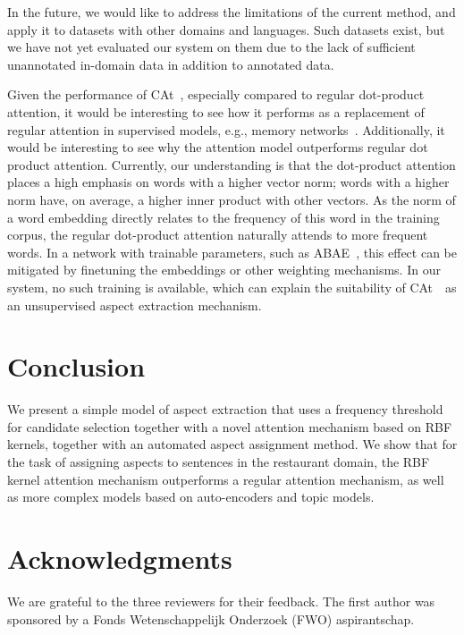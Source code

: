 \documentclass[11pt,a4paper]{article}
\newlength{\catheight}
\newcommand{\ourmodel}{CAt~\raisebox{-0.1ex}{\texttt{[image: fig/cat]}}} \definecolor{aspectcolor}{HTML}{fb7e5e}
\begin{document}
In the future, we would like to address the limitations of the current method, and apply it to
datasets with other domains and languages.
Such datasets exist, but we have not yet evaluated our system on them due to the lack of sufficient unannotated in-domain data in addition to annotated data.

Given the performance of \ourmodel, especially compared to regular dot-product attention, it would be interesting to see how it performs as a replacement of regular attention in supervised models, e.g., memory networks~\citep{weston2014memory, sukhbaatar2015end}.
Additionally, it would be interesting to see why the attention model outperforms regular dot product attention. 
Currently, our understanding is that the dot-product attention places a high emphasis on words with a higher vector norm; words with a higher norm have, on average, a higher inner product with other vectors.
As the norm of a word embedding directly relates to the frequency of this word in the training corpus, the regular dot-product attention naturally attends to more frequent words.
In a network with trainable parameters, such as ABAE~\citep{he2017unsupervised}, this effect can be mitigated by finetuning the embeddings or other weighting mechanisms.
In our system, no such training is available, which can explain the suitability of \ourmodel\  as an unsupervised aspect extraction mechanism.

\section{Conclusion}

We present a simple model of aspect extraction that uses a frequency threshold for candidate selection together with a novel attention mechanism based on RBF kernels, together with an automated aspect assignment method.
We show that for the task of assigning aspects to sentences in the restaurant domain,
the RBF kernel attention mechanism outperforms a regular attention mechanism, as well as more complex models based on auto-encoders and topic models.

\section*{Acknowledgments}
We are grateful to the three reviewers for their feedback.
The first author was sponsored by a Fonds Wetenschappelijk Onderzoek (FWO) aspirantschap.




\end{document}
